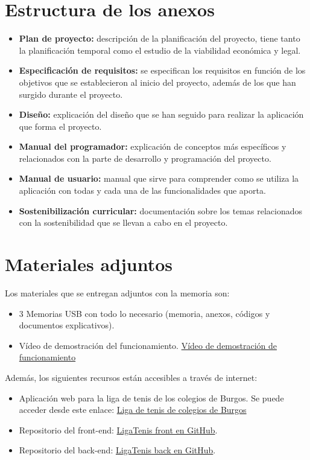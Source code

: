 \section{Estructura de los anexos}\label{estructura-anexos}

\begin{itemize}
\tightlist
\item
  \textbf{Plan de proyecto:} descripción de la planificación del proyecto, tiene tanto la planificación temporal como el estudio de la viabilidad económica y legal.
\item
  \textbf{Especificación de requisitos:} se especifican los requisitos en función de los objetivos que se establecieron al inicio del proyecto, además de los que han surgido durante el proyecto.
\item
  \textbf{Diseño:} explicación del diseño que se han seguido para realizar la aplicación que forma el proyecto.
\item
  \textbf{Manual del programador:} explicación de conceptos más específicos y relacionados con la parte de desarrollo y programación del proyecto.
\item
  \textbf{Manual de usuario:} manual que sirve para comprender como se utiliza la aplicación con todas y cada una de las funcionalidades que aporta.
\item
  \textbf{Sostenibilización curricular:} documentación sobre los temas relacionados con la sostenibilidad que se llevan a cabo en el proyecto.
\end{itemize}


\section{Materiales adjuntos}\label{materiales-adjuntos}

Los materiales que se entregan adjuntos con la memoria son: 

\begin{itemize}
\tightlist
\item
	3 Memorias USB con todo lo necesario (memoria, anexos, códigos y documentos explicativos).
\item	
	Vídeo de demostración del funcionamiento. \href{https://youtu.be/HogsCP8SG0E}{Vídeo de demostración de funcionamiento}
\end{itemize}

Además, los siguientes recursos están accesibles a través de internet:

\begin{itemize}
\tightlist
\item
Aplicación web para la liga de tenis de los colegios de Burgos.
    Se puede acceder desde este enlace: \href{http://ligatenisburgos.es/}{Liga de tenis de colegios de Burgos}

\item Repositorio del front-end: 
    \href{https://github.com/Nachoozg/tfg}{LigaTenis front en GitHub}.
    
\item Repositorio del back-end: 
    \href{https://github.com/Nachoozg/tfg-back}{LigaTenis back en GitHub}.

\end{itemize}
